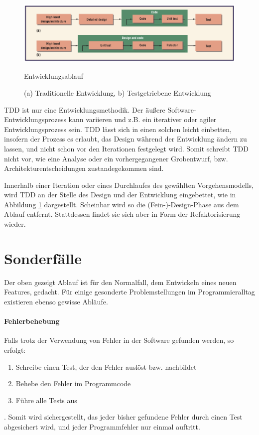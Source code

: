     \begin{figure}[hbtp]
 \centering
 \includegraphics[width=\textwidth]{./diagrams/ablauf.png}
 \caption{Entwicklungsablauf}
 \caption*{(a) Traditionelle Entwicklung,  b) Testgetriebene Entwicklung}
 \label{fig:devflow}
\end{figure}
 TDD ist nur eine Entwicklungsmethodik. Der äußere Software-Entwicklungsprozess kann variieren und z.B. ein iterativer oder agiler Entwicklungsprozess sein. TDD lässt sich in einen solchen leicht einbetten, insofern der Prozess es erlaubt, das Design während der Entwicklung ändern zu lassen, und nicht schon vor den Iterationen festgelegt wird. Somit schreibt TDD nicht vor, wie eine Analyse oder ein vorhergegangener Grobentwurf, bzw. Architekturentscheidungen zustandegekommen sind.

 Innerhalb einer Iteration oder eines Durchlaufes des gewählten Vorgehensmodells, wird TDD an der Stelle des Design und der Entwicklung eingebettet, wie in Abbildung \ref{fig:devflow} dargestellt. Scheinbar wird so die (Fein-)-Design-Phase aus dem Ablauf entfernt. Stattdessen findet sie sich aber in Form der Refaktorisierung wieder.


  \section{Sonderfälle}
  \label{sec:tddspecialcircumstances}

  Der oben gezeigt Ablauf ist für den Normalfall, dem Entwickeln eines neuen Features, gedacht. Für einige gesonderte Problemstellungen im Programmieralltag existieren ebenso gewisse Abläufe.

  \paragraph{Fehlerbehebung} Falls trotz der Verwendung von  Fehler in der Software gefunden werden, so erfolgt:
  \begin{enumerate}
   \item Schreibe einen Test, der den Fehler auslöst bzw. nachbildet
   \item Behebe den Fehler im Programmcode
   \item Führe alle Tests aus
  \end{enumerate}.
  Somit wird sichergestellt, das jeder bisher gefundene Fehler durch einen Test abgesichert wird, und jeder Programmfehler nur einmal auftritt.
